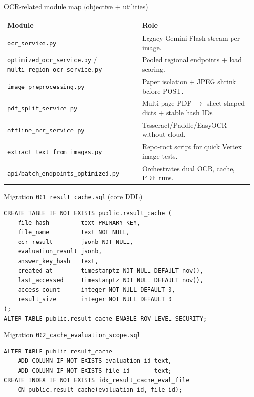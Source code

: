 \documentclass[aspectratio=169]{beamer}
\begin{document}
\begin{frame}{OCR-related module map (objective + utilities)}
  \tiny
  \begin{tabular}{@{}p{4.85cm}p{9.05cm}@{}}
    \toprule
    Module & Role \\
    \midrule
    \texttt{ocr\_service.py} & Legacy Gemini Flash stream per image. \\
    \texttt{optimized\_ocr\_service.py} / \texttt{multi\_region\_ocr\_service.py} & Pooled regional endpoints + load scoring. \\
    \texttt{image\_preprocessing.py} & Paper isolation + JPEG shrink before POST. \\
    \texttt{pdf\_split\_service.py} & Multi-page PDF $\rightarrow$ sheet-shaped dicts + stable hash IDs. \\
    \texttt{offline\_ocr\_service.py} & Tesseract/Paddle/EasyOCR without cloud. \\
    \texttt{extract\_text\_from\_images.py} & Repo-root script for quick Vertex image tests. \\
    \texttt{api/batch\_endpoints\_optimized.py} & Orchestrates dual OCR, cache, PDF runs. \\
    \bottomrule
  \end{tabular}
\end{frame}

\begin{frame}[fragile]{Migration \texttt{001\_result\_cache.sql} (core DDL)}
\begin{lstlisting}[style=py]
CREATE TABLE IF NOT EXISTS public.result_cache (
    file_hash         text PRIMARY KEY,
    file_name         text NOT NULL,
    ocr_result        jsonb NOT NULL,
    evaluation_result jsonb,
    answer_key_hash   text,
    created_at        timestamptz NOT NULL DEFAULT now(),
    last_accessed     timestamptz NOT NULL DEFAULT now(),
    access_count      integer NOT NULL DEFAULT 0,
    result_size       integer NOT NULL DEFAULT 0
);
ALTER TABLE public.result_cache ENABLE ROW LEVEL SECURITY;
\end{lstlisting}
\end{frame}

\begin{frame}[fragile]{Migration \texttt{002\_cache\_evaluation\_scope.sql}}
\begin{lstlisting}[style=py]
ALTER TABLE public.result_cache
    ADD COLUMN IF NOT EXISTS evaluation_id text,
    ADD COLUMN IF NOT EXISTS file_id       text;
CREATE INDEX IF NOT EXISTS idx_result_cache_eval_file
    ON public.result_cache(evaluation_id, file_id);
\end{lstlisting}
\end{frame}
\end{document}
